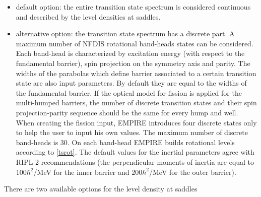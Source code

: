 \begin{itemize}
\item default option: the entire transition state spectrum is considered
continuous and described by the level densities at saddles.

\item alternative option: the transition state spectrum has a discrete part.
A maximum number of NFDIS rotational band-heads states can be considered.
Each band-head is characterized by excitation energy (with respect to the
fundamental barrier), spin projection on the symmetry axis and parity. The
widths of the parabolas which define barrier associated to a certain
transition state are also input parameters. By default they are equal to the
widths of the fundamental barrier. If the optical model for fission is
applied for the multi-humped barriers, the number of discrete transition
states and their spin projection-parity sequence should be the same for
every hump and well. When creating the fission input, EMPIRE introduces four
discrete states only to help the user to input his own values. The maximum
number of discrete band-heads is 30. On each band-head EMPIRE builds
rotational levels according to \ref{tsrot}. The default values for the
inertial parameters agree with RIPL-2 recommendations (the perpendicular
moments of inertia are equal to 100$\hbar^{2}$/MeV for the inner barrier and
200$\hbar^{2}$/MeV for the outer barrier).
\end{itemize}

There are two available options for the level density at saddles

